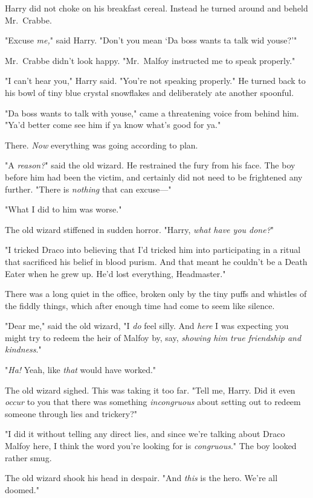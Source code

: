 Harry did not choke on his breakfast cereal. Instead he turned around and
beheld Mr.~Crabbe.

"Excuse \emph{me,}" said Harry. "Don't you mean `Da boss wants ta talk wid
youse?'"

Mr.~Crabbe didn't look happy. "Mr.~Malfoy instructed me to speak properly."

"I can't hear you," Harry said. "You're not speaking properly." He turned back
to his bowl of tiny blue crystal snowflakes and deliberately ate another
spoonful.

"Da boss wants to talk with youse," came a threatening voice from behind him.
"Ya'd better come see him if ya know what's good for ya."

There. \emph{Now} everything was going according to plan.

"A \emph{reason?}" said the old wizard. He restrained the fury from his face.
The boy before him had been the victim, and certainly did not need to be
frightened any further. "There is \emph{nothing} that can excuse---"

"What I did to him was worse."

The old wizard stiffened in sudden horror. "Harry, \emph{what have you done?}"

"I tricked Draco into believing that I'd tricked him into participating in a
ritual that sacrificed his belief in blood purism. And that meant he couldn't
be a Death Eater when he grew up. He'd lost everything, Headmaster."

There was a long quiet in the office, broken only by the tiny puffs and
whistles of the fiddly things, which after enough time had come to seem like
silence.

"Dear me," said the old wizard, "I \emph{do} feel silly. And \emph{here} I was
expecting you might try to redeem the heir of Malfoy by, say, \emph{showing him
true friendship and kindness}."

"\emph{Ha!} Yeah, like \emph{that} would have worked."

The old wizard sighed. This was taking it too far. "Tell me, Harry. Did it even
\emph{occur} to you that there was something \emph{incongruous} about setting
out to redeem someone through lies and trickery?"

"I did it without telling any direct lies, and since we're talking about Draco
Malfoy here, I think the word you're looking for is \emph{congruous}." The boy
looked rather smug.

The old wizard shook his head in despair. "And \emph{this} is the hero. We're
all doomed."

